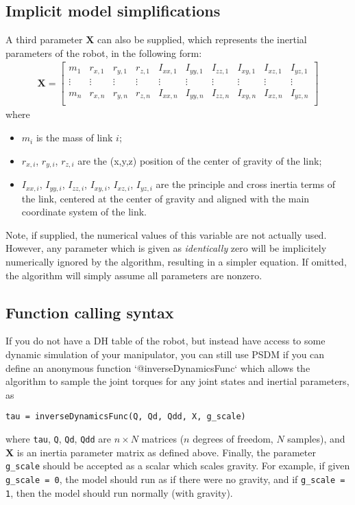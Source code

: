 \documentclass[12pt]{article}
\renewcommand{\b}[1]{\mathbf{#1}}
\begin{document}
\subsection{Implicit model simplifications}
A third parameter $\mathbf{X}$ can also be supplied, which represents the inertial parameters of the robot, in the following form:
\begin{align}
	\b{X} = \begin{bmatrix}
		m_1 & r_{x,1} & r_{y,1} & r_{z,1} & I_{xx,1} & I_{yy,1} & I_{zz,1} & I_{xy,1} & I_{xz,1} & I_{yz,1}\\
		\vdots &\vdots &\vdots &\vdots &\vdots &\vdots&\vdots&\vdots&\vdots&\vdots\\
		m_n & r_{x,n} & r_{y,n} & r_{z,n} & I_{xx,n} & I_{yy,n} & I_{zz,n} & I_{xy,n} & I_{xz,n} & I_{yz,n}\\
	\end{bmatrix}
\end{align}
where
\begin{itemize}[itemsep=0pt]
	\item $m_i$ is the mass of link $i$;
	\item $r_{x,i}$, $r_{y,i}$, $r_{z,i}$ are the (x,y,z) position of the center of gravity of the link;
	\item $I_{xx,i}$, $I_{yy,i}$, $I_{zz,i}$, $I_{xy,i}$, $I_{xz,i}$, $I_{yz,i}$ are the principle and cross inertia terms of the link, centered at the center of gravity and aligned with the main coordinate system of the link.
\end{itemize}
Note, if supplied, the numerical values of this variable are not actually used. However, any parameter which is given as \textit{identically} zero will be implicitely numerically ignored by the algorithm, resulting in a simpler equation. If omitted, the algorithm will simply assume all parameters are nonzero.

\subsection{Function calling syntax}

If you do not have a DH table of the robot, but instead have access to some dynamic simulation of your manipulator, you can still use PSDM if you can define an anonymous function `@inverseDynamicsFunc` which allows the algorithm to sample the joint torques for any joint states and inertial parameters, as
\begin{lstlisting}
tau = inverseDynamicsFunc(Q, Qd, Qdd, X, g_scale)
\end{lstlisting}\vspace{1em}
where \texttt{tau}, \texttt{Q}, \texttt{Qd}, \texttt{Qdd} are $n \times N$ matrices ($n$ degrees of freedom, $N$ samples), and $\mathbf{X}$ is an inertia parameter matrix as defined above. Finally, the parameter \texttt{g\_scale} should be accepted as a scalar which scales gravity. For example, if given \texttt{g\_scale = 0}, the model should run as if there were no gravity, and if \texttt{g\_scale = 1}, then the model should run normally (with gravity).
\end{document}
